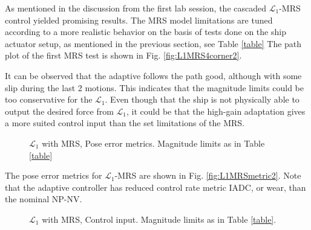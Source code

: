 As mentioned in the discussion from the first lab session, the cascaded $\mathcal{L}_1$-MRS control yielded promising results. The MRS model limitations are tuned according to a more realistic behavior on the basis of tests done on the ship actuator setup, as mentioned in the previous section, see Table \ref{table} The path plot of the first MRS test is shown in Fig. \ref{fig:L1MRS4corner2}. 

It can be observed that the adaptive follows the path good, although with some slip during the last 2 motions. This indicates that the magnitude limits could be too conservative for the $\mathcal{L}_1$. Even though that the ship is not physically able to output the desired force from $\mathcal{L}_1$, it could be that the high-gain adaptation gives a more suited control input than the set limitations of the MRS. 

\begin{figure}[!h]
    \centering
    \caption{$\mathcal{L}_1$ with MRS, Pose error metrics. Magnitude limits as in Table \ref{table} }
\end{figure}\label{fig:L1MRSmetric2}

The pose error metrics for $\mathcal{L}_1$-MRS are shown in Fig. \ref{fig:L1MRSmetric2}. Note that the adaptive controller has reduced control rate metric IADC, or wear, than the nominal NP-NV. 
\begin{figure}[!h]
    \centering
    \caption{$\mathcal{L}_1$ with MRS, Control input. Magnitude limits as in Table \ref{table}.}
\end{figure}\label{fig:L1MRS4tau2}

